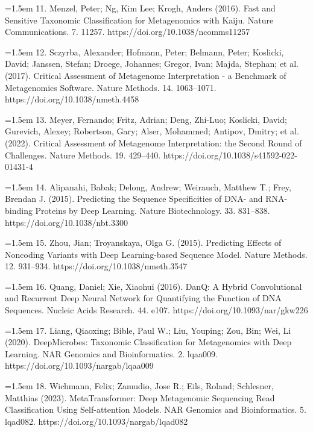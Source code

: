 \documentclass[11pt]{article}
\begin{document}
\hangindent=1.5em  11. Menzel, Peter; Ng, Kim Lee; Krogh, Anders (2016). Fast and Sensitive Taxonomic Classification for Metagenomics with Kaiju. Nature Communications. 7. 11257. https://doi.org/10.1038/ncomms11257\par

\hangindent=1.5em  12. Sczyrba, Alexander; Hofmann, Peter; Belmann, Peter; Koslicki, David; Janssen, Stefan; Droege, Johannes; Gregor, Ivan; Majda, Stephan; et al. (2017). Critical Assessment of Metagenome Interpretation - a Benchmark of Metagenomics Software. Nature Methods. 14. 1063--1071. https://doi.org/10.1038/nmeth.4458\par

\hangindent=1.5em  13. Meyer, Fernando; Fritz, Adrian; Deng, Zhi-Luo; Koslicki, David; Gurevich, Alexey; Robertson, Gary; Alser, Mohammed; Antipov, Dmitry; et al. (2022). Critical Assessment of Metagenome Interpretation: the Second Round of Challenges. Nature Methods. 19. 429--440. https://doi.org/10.1038/s41592-022-01431-4\par

\hangindent=1.5em  14. Alipanahi, Babak; Delong, Andrew; Weirauch, Matthew T.; Frey, Brendan J. (2015). Predicting the Sequence Specificities of DNA- and RNA-binding Proteins by Deep Learning. Nature Biotechnology. 33. 831--838. https://doi.org/10.1038/nbt.3300\par

\hangindent=1.5em  15. Zhou, Jian; Troyanskaya, Olga G. (2015). Predicting Effects of Noncoding Variants with Deep Learning-based Sequence Model. Nature Methods. 12. 931--934. https://doi.org/10.1038/nmeth.3547\par

\hangindent=1.5em  16. Quang, Daniel; Xie, Xiaohui (2016). DanQ: A Hybrid Convolutional and Recurrent Deep Neural Network for Quantifying the Function of DNA Sequences. Nucleic Acids Research. 44. e107. https://doi.org/10.1093/nar/gkw226\par

\hangindent=1.5em  17. Liang, Qiaoxing; Bible, Paul W.; Liu, Youping; Zou, Bin; Wei, Li (2020). DeepMicrobes: Taxonomic Classification for Metagenomics with Deep Learning. NAR Genomics and Bioinformatics. 2. lqaa009. https://doi.org/10.1093/nargab/lqaa009\par

\hangindent=1.5em  18. Wichmann, Felix; Zamudio, Jose R.; Eils, Roland; Schlesner, Matthias (2023). MetaTransformer: Deep Metagenomic Sequencing Read Classification Using Self-attention Models. NAR Genomics and Bioinformatics. 5. lqad082. https://doi.org/10.1093/nargab/lqad082\par
\end{document}
